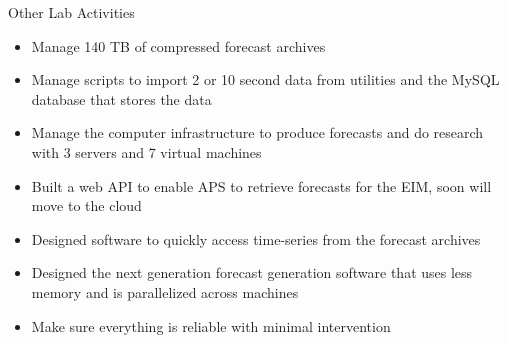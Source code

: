 \documentclass[aspectratio=169]{beamer}
\begin{document}
\begin{frame}{Other Lab Activities}
\begin{itemize}
\item Manage 140 TB of compressed forecast archives
\item Manage scripts to import 2 or 10 second data from utilities and
  the MySQL database that stores the data
\item Manage the computer infrastructure to produce forecasts and do
  research with 3 servers and 7 virtual machines
\item Built a web API to enable APS to retrieve forecasts for the EIM,
  soon will move to the cloud
\item Designed software to quickly access time-series from the forecast
  archives
\item Designed the next generation forecast generation software that
  uses less memory and is parallelized across machines
\item Make sure everything is reliable with minimal intervention
\end{itemize}
\end{frame}
\end{document}
